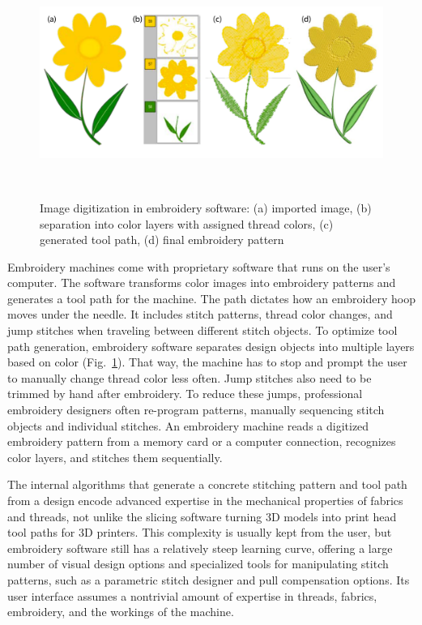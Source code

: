 \documentclass[header.tex]{subfiles}
\begin{document}
 \begin{figure}
\centering
  \includegraphics[width=0.9\columnwidth]{figures/EMWorkflow}
  \caption{Image digitization in embroidery software: (a) imported image, (b) separation into color layers with assigned thread colors, (c) generated tool path, (d) final embroidery pattern }~\label{fig:EmbroideryWorkflow}
  \vspace{-2.5em}
\end{figure}

Embroidery machines come with proprietary software that runs on the user's computer. The software transforms color images into embroidery patterns and generates a tool path for the machine. The path dictates how an embroidery hoop moves under the needle. It includes stitch patterns, thread color changes, and jump stitches when traveling between different stitch objects. To optimize tool path generation, embroidery software separates design objects into multiple layers based on color (Fig.\ \ref{fig:EmbroideryWorkflow}). That way, the machine has to stop and prompt the user to manually change thread color less often. Jump stitches also need to be trimmed by hand after embroidery. To reduce these jumps, professional embroidery designers often re-program patterns, manually sequencing stitch objects and individual stitches. 
An embroidery machine reads a digitized embroidery pattern from a memory card or a computer connection, recognizes color layers, and stitches them sequentially.


The internal algorithms that generate a concrete stitching pattern and tool path from a design encode advanced expertise in the mechanical properties of fabrics and threads, not unlike the slicing software turning 3D models into print head tool paths for 3D printers. This complexity is usually kept from the user, but embroidery software still has a relatively steep learning curve, offering a large number of visual design options and specialized tools for manipulating stitch patterns, such as a parametric stitch designer and pull compensation options.
Its user interface assumes a nontrivial amount of expertise in threads, fabrics, embroidery, and the workings of the machine.
\end{document}
